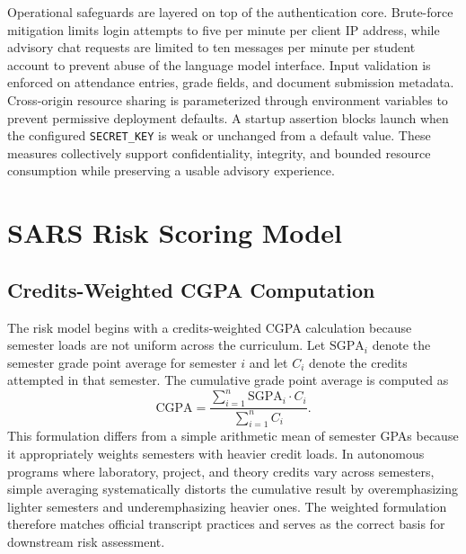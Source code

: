 \documentclass[conference]{IEEEtran}
\begin{document}
Operational safeguards are layered on top of the authentication core. Brute-force mitigation limits login attempts to five per minute per client IP address, while advisory chat requests are limited to ten messages per minute per student account to prevent abuse of the language model interface. Input validation is enforced on attendance entries, grade fields, and document submission metadata. Cross-origin resource sharing is parameterized through environment variables to prevent permissive deployment defaults. A startup assertion blocks launch when the configured \texttt{SECRET\_KEY} is weak or unchanged from a default value. These measures collectively support confidentiality, integrity, and bounded resource consumption while preserving a usable advisory experience.

\section{SARS Risk Scoring Model}
\subsection{Credits-Weighted CGPA Computation}
The risk model begins with a credits-weighted CGPA calculation because semester loads are not uniform across the curriculum. Let $\mathrm{SGPA}_i$ denote the semester grade point average for semester $i$ and let $C_i$ denote the credits attempted in that semester. The cumulative grade point average is computed as
\begin{equation}
\mathrm{CGPA} = \frac{\sum_{i=1}^{n} \mathrm{SGPA}_i \cdot C_i}{\sum_{i=1}^{n} C_i}.
\label{eq:cgpa}
\end{equation}
This formulation differs from a simple arithmetic mean of semester GPAs because it appropriately weights semesters with heavier credit loads. In autonomous programs where laboratory, project, and theory credits vary across semesters, simple averaging systematically distorts the cumulative result by overemphasizing lighter semesters and underemphasizing heavier ones. The weighted formulation therefore matches official transcript practices and serves as the correct basis for downstream risk assessment.
\end{document}
